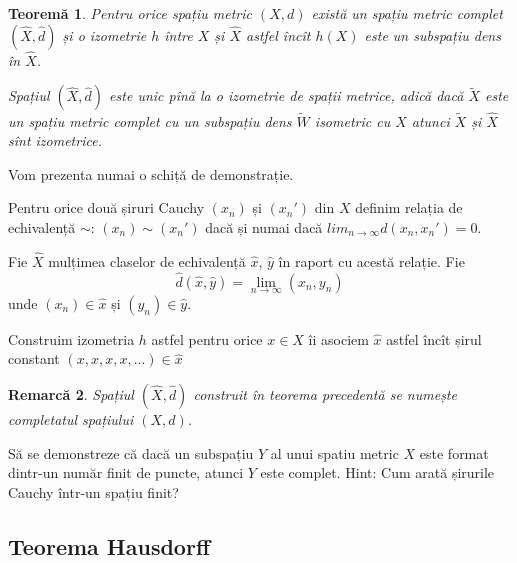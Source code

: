 \documentclass[a4paper,12pt]{article}
\theoremstyle{change}
\newtheorem{theorem}{Teoremă}[section]
\newtheorem{remark}[theorem]{Remarcă}
\newenvironment{proof}[1][Proof]{\begin{trivlist}
\item[\hskip \labelsep {\bfseries #1}]}{\end{trivlist}}
\begin{document}
\begin{theorem}
Pentru orice spațiu metric $(X, d)$ există un spațiu metric complet $(\hat{X}, \hat{d})$ și o izometrie $h$ între $X$ și $\hat{X}$ astfel încît $h(X)$ este un subspațiu dens în $\hat{X}$. 

Spațiul $(\hat{X},\hat{d})$ este unic pînă la o izometrie de spații metrice, adică dacă $\tilde{X}$ este un spațiu metric complet cu un subspațiu dens $\tilde{W}$ isometric cu $X$ atunci $\tilde{X}$ și $\hat{X}$ sînt izometrice.
\end{theorem}

\begin{proof}
Vom prezenta numai o schiță de demonstrație.

Pentru orice două șiruri Cauchy $(x_n)$ și $(x_n')$ din $X$ definim relația de echivalență $\sim$: $(x_n)\sim(x_n')$ dacă și numai dacă $lim_{n\to\infty}d(x_n,x_n')=0$.

Fie $\hat{X}$ mulțimea claselor de echivalență $\hat{x}$, $\hat{y}$ în raport cu acestă relație. Fie 
\[
	\hat{d}(\hat{x},\hat{y})=\lim_{n\to\infty}(x_n,y_n)
\]
unde $(x_n)\in\hat{x}$ și $(y_n)\in\hat{y}$.

Construim izometria $h$ astfel pentru orice $x\in X$ îi asociem $\hat{x}$ astfel încît șirul constant $(x,x,x,x,...)\in \hat{x}$
\end{proof}

\begin{remark}
Spațiul $(\hat{X},\hat{d})$ construit în teorema precedentă se numește \emph{completatul} spațiului $(X,d)$.
\end{remark}

\begin{ExerciseList}
\Exercise Să se demonstreze că dacă un subspațiu $Y$ al unui spatiu metric $X$ este format dintr-un număr finit de puncte, atunci $Y$ este complet.
\Answer Hint: Cum arată șirurile Cauchy într-un spațiu finit?
\end{ExerciseList}

\subsection{Teorema Hausdorff}


\end{document}
